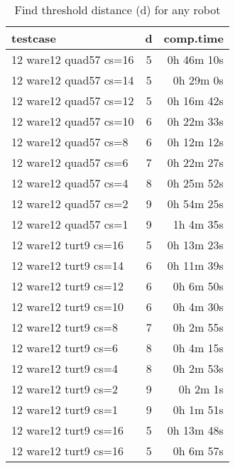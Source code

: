 \documentclass{article}
\begin{document}
\begin{table}[h!]
  \begin{center}
    \caption{Find threshold distance (d) for any robot}
    \label{tab:table1}
    \begin{tabular}{l|c|r}
      \textbf{testcase} & \textbf{d} & \textbf{comp.time}\\
      \hline
       12 ware12 quad57 cs=16 & 5 & 0h 46m 10s \\
       12 ware12 quad57 cs=14 & 5 & 0h 29m 0s \\
       12 ware12 quad57 cs=12 & 5 & 0h 16m 42s \\
       12 ware12 quad57 cs=10 & 6 & 0h 22m 33s \\
       12 ware12 quad57 cs=8 & 6 & 0h 12m 12s \\
       12 ware12 quad57 cs=6 & 7 & 0h 22m 27s \\
       12 ware12 quad57 cs=4 & 8 & 0h 25m 52s \\
       12 ware12 quad57 cs=2 & 9 & 0h 54m 25s \\
       12 ware12 quad57 cs=1 & 9 & 1h 4m 35s \\
      \hline
       12 ware12 turt9
 cs=16 & 5 & 0h 13m 23s \\
       12 ware12 turt9
 cs=14 & 6 & 0h 11m 39s \\
       12 ware12 turt9
 cs=12 & 6 & 0h 6m 50s \\
       12 ware12 turt9
 cs=10 & 6 & 0h 4m 30s \\
       12 ware12 turt9
 cs=8 & 7 & 0h 2m 55s \\
       12 ware12 turt9
 cs=6 & 8 & 0h 4m 15s \\
       12 ware12 turt9
 cs=4 & 8 & 0h 2m 53s \\
       12 ware12 turt9
 cs=2 & 9 & 0h 2m 1s \\
       12 ware12 turt9
 cs=1 & 9 & 0h 1m 51s \\
       12 ware12 turt9
 cs=16 & 5 & 0h 13m 48s \\
      \hline
       12 ware12 turt9
 cs=16 & 5 & 0h 6m 57s \\
    \end{tabular}
  \end{center}
\end{table}
\end{document}
